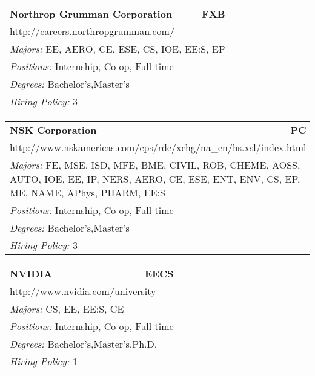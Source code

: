 \documentclass[twoside]{article}
\begin{document}
\begin{center}
\begin{multicols}{3}
\begin{FlushLeft}
\begin{minipage}{\columnwidth}\begin{tabularx}{.95\columnwidth}{Xr}
                 {\Large\bf Northrop Grumman Corporation} & {\Large\bf FXB}\\
    \multicolumn{2}{p{.95\columnwidth}}{\url{http://careers.northropgrumman.com/}}\\
    \multicolumn{2}{p{.95\columnwidth}}{\emph{Majors:} EE, AERO, CE, ESE, CS, IOE, EE:S, EP}\\
    \multicolumn{2}{p{.95\columnwidth}}{\emph{Positions:} Internship, Co-op, Full-time}\\
    \multicolumn{2}{p{.95\columnwidth}}{\emph{Degrees:} Bachelor's,Master's}\\
    \multicolumn{2}{p{.95\columnwidth}}{\emph{Hiring Policy:} 3}\\
    \end{tabularx}
    
\end{minipage}
 
\begin{minipage}{\columnwidth}\begin{tabularx}{.95\columnwidth}{Xr}
                 {\Large\bf NSK Corporation} & {\Large\bf PC}\\
    \multicolumn{2}{p{.95\columnwidth}}{\url{http://www.nskamericas.com/cps/rde/xchg/na_en/hs.xsl/index.html}}\\
    \multicolumn{2}{p{.95\columnwidth}}{\emph{Majors:} FE, MSE, ISD, MFE, BME, CIVIL, ROB, CHEME, AOSS, AUTO, IOE, EE, IP, NERS, AERO, CE, ESE, ENT, ENV, CS, EP, ME, NAME, APhys, PHARM, EE:S}\\
    \multicolumn{2}{p{.95\columnwidth}}{\emph{Positions:} Internship, Co-op, Full-time}\\
    \multicolumn{2}{p{.95\columnwidth}}{\emph{Degrees:} Bachelor's,Master's}\\
    \multicolumn{2}{p{.95\columnwidth}}{\emph{Hiring Policy:} 3}\\
    \end{tabularx}
    
\end{minipage}
 
\begin{minipage}{\columnwidth}\begin{tabularx}{.95\columnwidth}{Xr}
                 {\Large\bf NVIDIA} & {\Large\bf EECS}\\
    \multicolumn{2}{p{.95\columnwidth}}{\url{http://www.nvidia.com/university}}\\
    \multicolumn{2}{p{.95\columnwidth}}{\emph{Majors:} CS, EE, EE:S, CE}\\
    \multicolumn{2}{p{.95\columnwidth}}{\emph{Positions:} Internship, Co-op, Full-time}\\
    \multicolumn{2}{p{.95\columnwidth}}{\emph{Degrees:} Bachelor's,Master's,Ph.D.}\\
    \multicolumn{2}{p{.95\columnwidth}}{\emph{Hiring Policy:} 1}\\
    \end{tabularx}
    

\end{minipage}
\end{FlushLeft}
\end{multicols}
\end{center}
\end{document}
